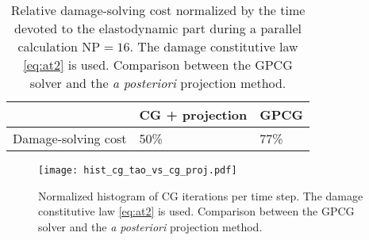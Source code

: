 \begin{table}[htbp]
\centering
\caption{Relative damage-solving cost normalized by the time devoted to the elastodynamic part during a parallel calculation $\mathrm{NP}=16$. The damage constitutive law \eqref{eq:at2} is used. Comparison between the GPCG solver and the \emph{a posteriori} projection method.} \label{tab:gpcg_vs_cg_proj}
\begin{tabular}{lll} \toprule
&  CG + projection & GPCG \\ \midrule
Damage-solving cost & 50\% & 77\% \\ \bottomrule
\end{tabular}
\end{table}
\begin{figure}[htbp]
\centering
\texttt{[image: hist\_cg\_tao\_vs\_cg\_proj.pdf]}
\caption{Normalized histogram of CG iterations per time step. The damage constitutive law \eqref{eq:at2} is used. Comparison between the GPCG solver and the \emph{a posteriori} projection method.} \label{fig:histcg}
\end{figure}

